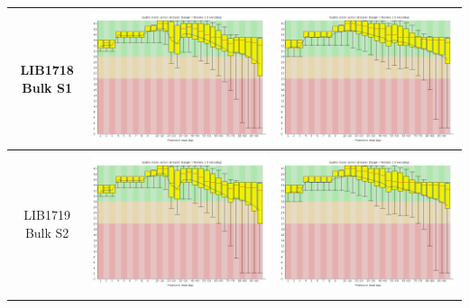 \begin{center}
\begin{tabular}{ccc}
\begin{sideways}LIB1718 Bulk S1\end{sideways} & \includegraphics[width=0.4 \textwidth]{Appendices/images/Sample_LIB1718_base_quality_R1.png} & \includegraphics[width=0.4 \textwidth]{Appendices/images/Sample_LIB1718_base_quality_R2.png} \\ \midrule  \\
\begin{sideways}LIB1719 Bulk S2\end{sideways} & \includegraphics[width=0.4 \textwidth]{Appendices/images/Sample_LIB1719_base_quality_R1.png} & \includegraphics[width=0.4 \textwidth]{Appendices/images/Sample_LIB1719_base_quality_R2.png} \\ \midrule  \\

\end{tabular}
\end{center}
